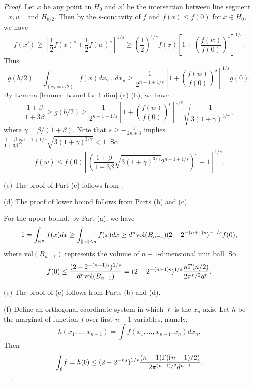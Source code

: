 \documentclass[11pt]{article}
\newcommand{\R}{\mathbb{R}}
\newcommand{\red}[1]{{\color{black}#1}}
\begin{document}
{{{{\begin{proof}
Let $x$ be any point on $H_0$ and $x'$ be the intersection between line segment $[x,w]$ and $H_{b/2}$. Then by the $s$-concavity of $f$ and $f(x)\le f(0)$ for $x\in H_0$, we have
\begin{equation*}
f(x')\ge \left[\frac{1}{2}f(x)^s+\frac{1}{2}f(w)^s\right]^{1/s}\ge\left(\frac{1}{2}\right)^{1/s}f(x)\left[1+\left(\frac{f(w)}{f(0)}\right)^{s}\right]^{1/s}.
\end{equation*}
Thus
\begin{equation*}
g(b/2)=\int_{(x_1=b/2)}f(x)dx_2...dx_n\ge\frac{1}{2^{n-1+1/s}}\left[1+\left(\frac{f(w)}{f(0)}\right)^{s}\right]^{1/s}g(0).
\end{equation*}
By Lemma \ref{lemma: bound for 1 dim} (a) (b), we have
\begin{equation*}
\frac{1+\beta}{1+3\beta}\ge g(b/2)\ge \frac{1}{2^{n-1+1/s}}\left[1+\left(\frac{f(w)}{f(0)}\right)^{s}\right]^{1/s}\sqrt{\frac{1}{3(1+\gamma)^{3/\gamma}}},
\end{equation*}
where $\gamma=\beta/(1+\beta)$. Note that $s\ge -\frac{1}{2n+3}$ implies $\frac{1+\beta}{1+3\beta}2^{n-1+1/s}\sqrt{3(1+\gamma)^{3/\gamma}}<1$. So
\begin{equation*}
f(w)\le f(0)\left[\left(\frac{1+\beta}{1+3\beta}\sqrt{3(1+\gamma)^{3/\gamma}}2^{n-1+1/s}\right)^{s}-1\right]^{1/s}.
\end{equation*}

(c) The proof of Part (c) follows from \cite{lovasz2007geometry}.

(d) The proof of lower bound follows from Parts (b) and (c).

For the upper bound, by Part (a), we have
\begin{equation*}
1=\int_{\R^n}f(x)dx\ge \int_{\|x\|\le d}f(x)dx\ge \red{d^n \text{vol}(B_{n-1})(2-2^{-(n+1)s})^{-1/s}f(0),}
\end{equation*}
where $\text{vol}(B_{n-1})$ represents the volume of $n-1$-dimensional unit ball. So
\begin{equation*}
f(0)\le \red{\frac{(2-2^{-(n+1)s})^{1/s}}{d^n\text{vol}(B_{n-1})}=(2-2^{-(n+1)s})^{1/s}\frac{n\Gamma(n/2)}{2\pi^{n/2}d^n}.}
\end{equation*}

(e) The proof of (e) follows from Parts (b) and (d).

(f) Define an orthogonal coordinate system in which $\ell$ is the $x_n$-axis. Let $h$ be the marginal of function $f$ over first $n-1$ variables, namely,
\begin{equation*}
h(x_1,...,x_{n-1})=\int f(x_1,...,x_{n-1},x_n)dx_n.
\end{equation*}
Then
\begin{equation*}
\int_{\ell} f=h(0)\le \red{(2-2^{-ns})^{1/s}\frac{(n-1)\Gamma((n-1)/2)}{2\pi^{(n-1)/2}d^{n-1}}.}
\end{equation*}
\end{proof}


}}}}
\end{document}
